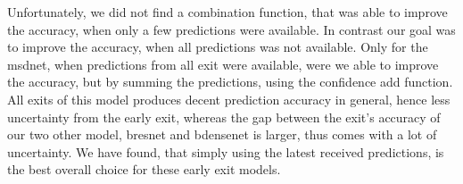 Unfortunately, we did not find a combination function, that was able to improve the accuracy, when only a few predictions were available. In contrast our goal was to improve the accuracy, when all predictions was not available. Only for the \gls{msdnet}, when predictions from all exit were available, were we able to improve the accuracy, but by summing the predictions, using the confidence add function. All exits of this model produces decent prediction accuracy in general, hence less uncertainty from the early exit, whereas the gap between the exit's accuracy of our two other model, \gls{bresnet} and \gls{bdensenet} is larger, thus comes with a lot of uncertainty. We have found, that simply using the latest received predictions, is the best overall choice for these early exit models.







   



